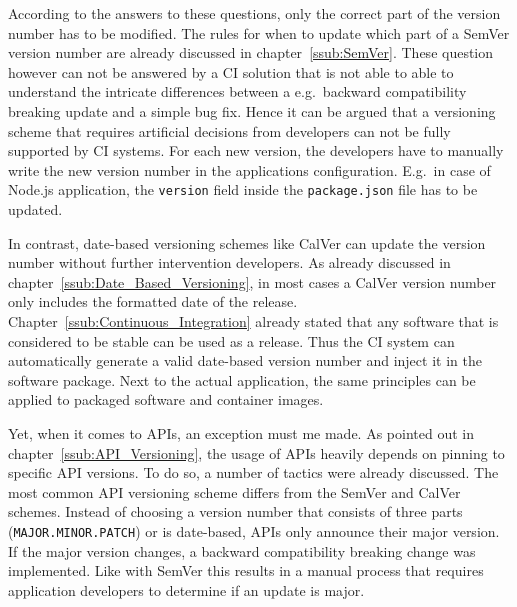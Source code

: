 According to the answers to these questions, only the correct part of the
version number has to be modified. The rules for when to update which part of a
SemVer version number are already discussed in chapter~\ref{ssub:SemVer}. These
question however can not be answered by a \ac{CI} solution that is not able to
able to understand the intricate differences between a e.g.\ backward
compatibility breaking update and a simple bug fix. Hence it can be argued that
a versioning scheme that requires artificial decisions from developers can not
be fully supported by \ac{CI} systems. For each new version, the developers
have to manually write the new version number in the applications
configuration. E.g.\ in case of Node.js application, the \texttt{version} field
inside the \texttt{package.json} file has to be updated.

In contrast, date-based versioning schemes like CalVer can update the version
number without further intervention developers. As already discussed in
chapter~\ref{ssub:Date_Based_Versioning}, in most cases a CalVer version number
only includes the formatted date of the release.
Chapter~\ref{ssub:Continuous_Integration} already stated that any software that
is considered to be stable can be used as a release. Thus the \ac{CI} system
can automatically generate a valid date-based version number and inject it in
the software package. Next to the actual application, the same principles can
be applied to packaged software and container images.

Yet, when it comes to \acp{API}, an exception must me made. As pointed out in
chapter~\ref{ssub:API_Versioning}, the usage of \acp{API} heavily depends on
pinning to specific \ac{API} versions. To do so, a number of tactics were
already discussed. The most common \ac{API} versioning scheme differs from the
SemVer and CalVer schemes. Instead of choosing a version number that consists
of three parts (\texttt{MAJOR.MINOR.PATCH}) or is date-based, \acp{API} only
announce their major version. If the major version changes, a backward
compatibility breaking change was implemented. Like with SemVer this results in
a manual process that requires application developers to determine if an update
is major.

